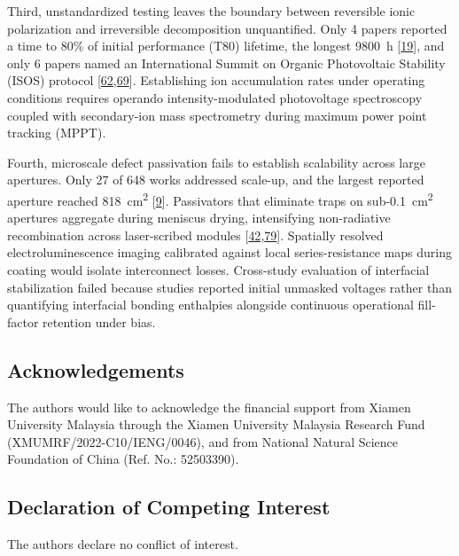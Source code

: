\documentclass[
  11pt,
]{article}
\begin{document}
Third, unstandardized testing leaves the boundary between reversible
ionic polarization and irreversible decomposition unquantified. Only 4
papers reported a time to 80\% of initial performance (T80) lifetime,
the longest \qty{9800}{\hour}
{[}\href{https://doi.org/10.1002/adma.74243}{19}{]}, and only 6 papers
named an International Summit on Organic Photovoltaic Stability (ISOS)
protocol
{[}\href{https://doi.org/10.1021/acsenergylett.6c01517}{62},\href{https://doi.org/10.1002/aenm.71358}{69}{]}.
Establishing ion accumulation rates under operating conditions requires
operando intensity-modulated photovoltage spectroscopy coupled with
secondary-ion mass spectrometry during maximum power point tracking
(MPPT).

Fourth, microscale defect passivation fails to establish scalability
across large apertures. Only 27 of 648 works addressed scale-up, and the
largest reported aperture reached \qty{818}{\centi\meter\squared}
{[}\href{https://doi.org/10.1021/jacs.6c06932}{9}{]}. Passivators that
eliminate traps on sub-\qty{0.1}{\centi\meter\squared} apertures
aggregate during meniscus drying, intensifying non-radiative
recombination across laser-scribed modules
{[}\href{https://doi.org/10.1126/sciadv.aed6327}{42},\href{https://doi.org/10.1002/solr.70375}{79}{]}.
Spatially resolved electroluminescence imaging calibrated against local
series-resistance maps during coating would isolate interconnect losses.
Cross-study evaluation of interfacial stabilization failed because
studies reported initial unmasked voltages rather than quantifying
interfacial bonding enthalpies alongside continuous operational
fill-factor retention under bias.

\subsection{Acknowledgements}\label{acknowledgements}

The authors would like to acknowledge the financial support from Xiamen
University Malaysia through the Xiamen University Malaysia Research Fund
(XMUMRF/2022-C10/IENG/0046), and from National Natural Science
Foundation of China (Ref. No.: 52503390).

\subsection{Declaration of Competing
Interest}\label{declaration-of-competing-interest}

The authors declare no conflict of interest.
\end{document}
